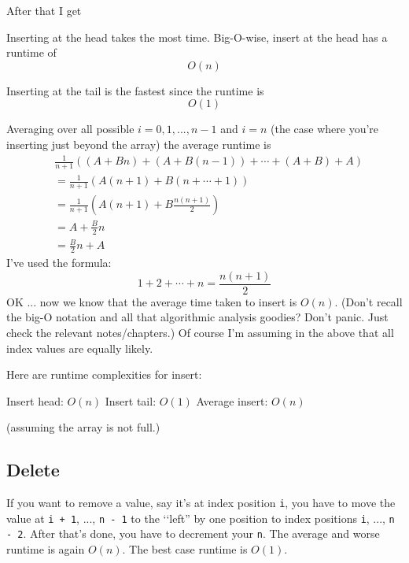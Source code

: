 After that I get


Inserting at the head takes the most time.
Big-O-wise, insert at the head has a runtime of
\[
O(n)
\]

Inserting at the tail is the fastest since the runtime is
\[
O(1)
\]


Averaging over all possible $i = 0, 1, ..., n - 1$ and $i = n$ (the case
where you're inserting just beyond the array)
the average runtime is
\begin{align*} 
&\frac{1}{n + 1}  \left(
                    (A + Bn) + (A + B(n-1)) + \cdots + (A + B) + A  
             \right) \\
&= 
\frac{1}{n + 1} \left(
                   A(n + 1) + B(n + \cdots + 1)
            \right) \\
&= \frac{1}{n + 1} \left( A(n + 1) + B\frac{n(n+1)}{2} \right) \\
&= A + \frac{B}{2}n \\
&= \frac{B}{2} n + A
\end{align*}
I've used the formula:
\[
1 + 2 + \cdots + n = \frac{n(n + 1)}{2}
\]
OK ... now we know that the average time taken to insert is $O(n)$.
(Don't recall the big-O notation and 
all that algorithmic analysis goodies? 
Don't panic. 
Just check the relevant notes/chapters.)
Of course I'm assuming in the above that 
all index values are equally likely.

Here are runtime complexities for insert:
\begin{tightlist}
  \li Insert head: $O(n)$
  \li Insert tail: $O(1)$
  \li Average insert: $O(n)$
\end{tightlist}
(assuming the array is not full.)

\newpage
\subsection{Delete}

If you want to remove a value, say it's at index position \verb!i!,
you have to move the value at \verb!i + 1!, ..., \verb!n - 1!
to the \lq\lq left'' by one position to index positions
\verb!i!, ..., \verb!n - 2!.
After that's done, you have to decrement your \verb!n!.
The average and worse runtime is again $O(n)$.
The best case runtime is $O(1)$.

